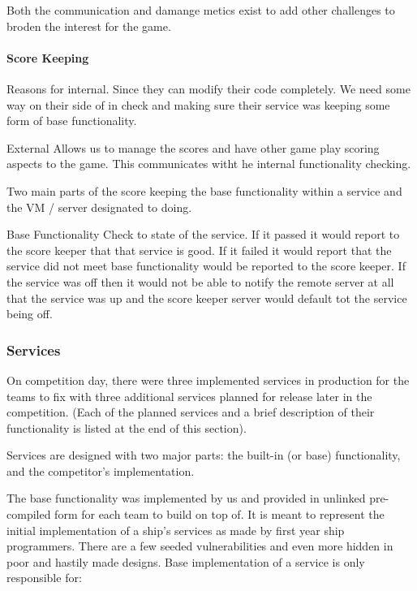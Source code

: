 \documentclass[10pt]{article}
\begin{document}
Both the communication and damange metics exist to add other challenges to
broden the interest for the game.

\paragraph*{Score Keeping}
Reasons for internal.
Since they can modify their code completely. We need some way on their side of
in check and making sure their service was keeping some form of base functionality.

External
Allows us to manage the scores and have other game play scoring aspects to the game.
This communicates witht he internal functionality checking.

Two main parts of the score keeping the base functionality within a service and
the VM / server designated to doing.

Base Functionality 
Check to state of the service.
If it passed it would report to the score keeper that that service is good.
If it failed it would report that the service did not meet base functionality would
be reported to the score keeper.
If the service was off then it would not be able to notify the remote server at all
that the service was up and the score keeper server would default tot the service
being off.

\subsubsection{Services}
\label{stservices}
On competition day, there were three implemented services in production for the
teams to fix with three additional services planned for release later in the
competition. (Each of the planned services and a brief description of their
functionality is listed at the end of this section).

Services are designed with two major parts: the built-in (or base)
functionality, and the competitor's implementation.

The base functionality was implemented by us and provided in unlinked
pre-compiled form for each team to build on top of. It is meant to represent the
initial implementation of a ship's services as made by first year ship
programmers. There are a few seeded vulnerabilities and even more hidden in poor
and hastily made designs. Base implementation of a service is only responsible
for:
\end{document}
